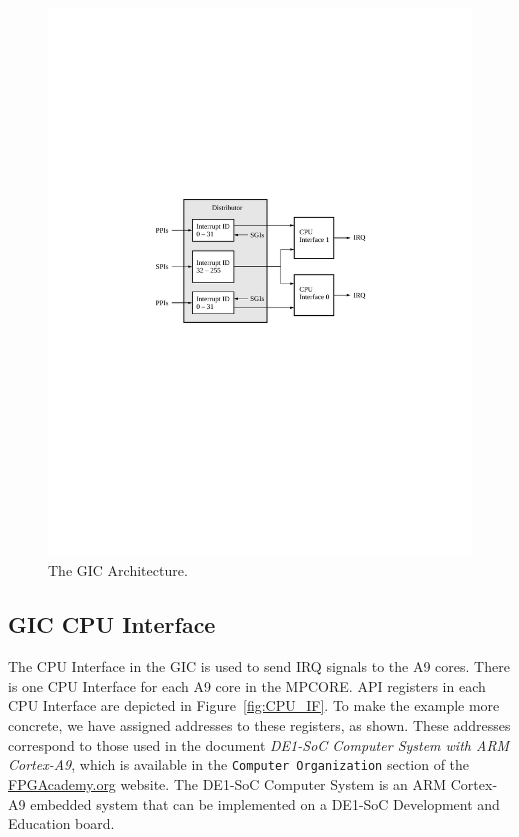 \documentclass[11pt, twoside, pdftex]{article}
\begin{document}
\begin{figure}[h!]
   \begin{center}
       \includegraphics{figures/GIC.pdf}
   \end{center}
   \caption{The GIC Architecture.}
	\label{fig:fig_GIC}
\end{figure}

\subsection{GIC CPU Interface}
\label{sec:CPU_IF} The CPU Interface in the GIC is used to send IRQ signals to the A9
cores. There is one CPU Interface for each A9 core in the MPCORE.  API registers 
in each CPU Interface are depicted in Figure~\ref{fig:CPU_IF}. To make the example more
concrete, we have assigned addresses to these registers, as shown. These addresses
correspond to those used in the document {\it DE1-SoC Computer System with ARM Cortex-A9},
which is available in the \texttt{Computer Organization} section of the 
{\small \href{https://www.fpgacademy.org/courses.html} {FPGAcademy.org}} website.
The DE1-SoC Computer System is an ARM
Cortex-A9 embedded system that can be implemented on a DE1-SoC Development and
Education board. 
\end{document}
